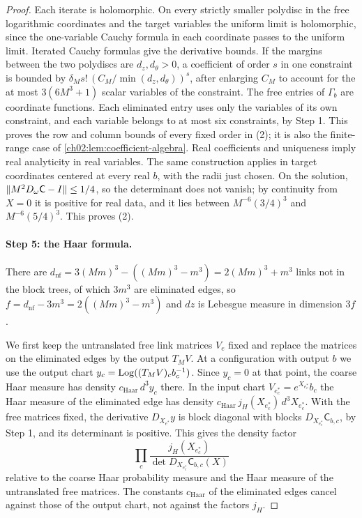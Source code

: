 \begin{proof}
Each iterate is holomorphic. On every strictly smaller polydisc in the free logarithmic coordinates and the target variables the uniform limit is holomorphic, since the one-variable Cauchy formula in each coordinate passes to the uniform limit. Iterated Cauchy formulas give the derivative bounds. If the margins between the two polydiscs are $d_z,d_\theta>0$, a coefficient of order $s$ in one constraint is bounded by $\delta_Ms!\,(C_M/\min(d_z,d_\theta))^s$, after enlarging $C_M$ to account for the at most $3(6M^3+1)$ scalar variables of the constraint. The free entries of $\Gamma_b$ are coordinate functions. Each eliminated entry uses only the variables of its own constraint, and each variable belongs to at most six constraints, by Step 1. This proves the row and column bounds of every fixed order in (2); it is also the finite-range case of \cref{ch02:lem:coefficient-algebra}. Real coefficients and uniqueness imply real analyticity in real variables. The same construction applies in target coordinates centered at every real $b$, with the radii just chosen. On the solution, $\lVert M^2D_\omega \mathsf C-I\rVert\le1/4$, so the determinant does not vanish; by continuity from $X=0$ it is positive for real data, and it lies between $M^{-6}(3/4)^3$ and $M^{-6}(5/4)^3$. This proves (2).

\paragraph{Step 5: the Haar formula.}
There are $d_{\mathrm{nf}}=3(Mm)^3-((Mm)^3-m^3)=2(Mm)^3+m^3$ links not in the block trees, of which $3m^3$ are eliminated edges, so $f=d_{\mathrm{nf}}-3m^3=2((Mm)^3-m^3)$ and $dz$ is Lebesgue measure in dimension $3f$.

We first keep the untranslated free link matrices $V_e$ fixed and replace the matrices on the eliminated edges by the output $T_MV$. At a configuration with output $b$ we use the output chart $y_c=\operatorname{Log}((T_MV)_cb_c^{-1})$. Since $y_c=0$ at that point, the coarse Haar measure has density $c_{\mathrm{Haar}}\,d^3y_c$ there. In the input chart $V_{e^*_c}=e^{X_{e^*_c}}b_c$ the Haar measure of the eliminated edge has density $c_{\mathrm{Haar}}\,j_H(X_{e^*_c})\,d^3X_{e^*_c}$. With the free matrices fixed, the derivative $D_{X_{e^*}}y$ is block diagonal with blocks $D_{X_{e^*_c}}\mathsf C_{b,c}$, by Step 1, and its determinant is positive. This gives the density factor
\begin{equation}\label{ch03:eq:distinguished-haar}
 \prod_c\frac{j_H(X_{e^*_c})}{\det D_{X_{e^*_c}}\mathsf C_{b,c}(X)}
\end{equation}
relative to the coarse Haar probability measure and the Haar measure of the untranslated free matrices. The constants $c_{\mathrm{Haar}}$ of the eliminated edges cancel against those of the output chart, not against the factors $j_H$.


\end{proof}
